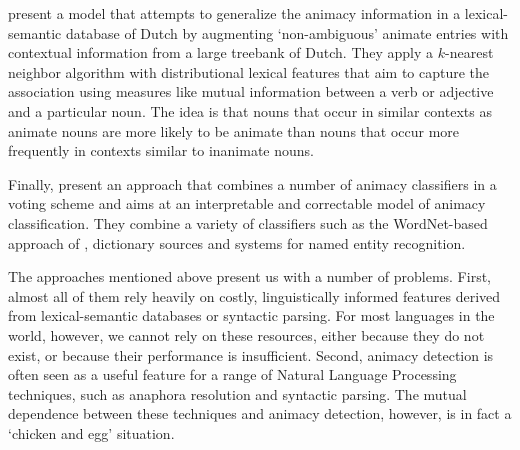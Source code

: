 \citeauthor{bloem:2013} present a model that attempts to generalize the animacy information in a lexical-semantic database of Dutch by augmenting `non-ambiguous' animate entries with contextual information from a large treebank of Dutch\autocite{bloem:2013}. They apply a $k$-nearest neighbor algorithm with distributional lexical features that aim to capture the association using measures like mutual information between a verb or adjective and a particular noun. The idea is that nouns that occur in similar contexts as animate nouns are more likely to be animate than nouns that occur more frequently in contexts similar to inanimate nouns.

Finally, \citeauthor{moore:2013} present an approach that combines a number of animacy classifiers in a voting scheme and aims at an interpretable and correctable model of animacy classification.\autocite{moore:2013} They combine a variety of classifiers such as the WordNet-based approach of \citeauthor{evans:2000}, dictionary sources and systems for named entity recognition.

The approaches mentioned above present us with a number of problems. First, almost all of them rely heavily on costly, linguistically informed features derived from lexical-semantic databases or syntactic parsing. For most languages in the world, however, we cannot rely on these resources, either because they do not exist, or because their performance is insufficient. Second, animacy detection is often seen as a useful feature for a range of Natural Language Processing techniques, such as anaphora resolution and syntactic parsing. The mutual dependence between these techniques and animacy detection, however, is in fact a `chicken and egg' situation.

